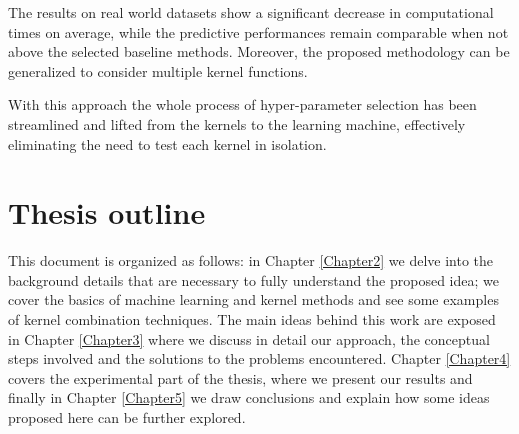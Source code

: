 
The results on real world datasets show a significant decrease in computational
times on average, while the predictive performances remain comparable when not
above the selected baseline methods.
Moreover, the proposed methodology can be generalized to consider multiple kernel functions.

With this approach the whole process of hyper-parameter selection has been streamlined and
lifted from the kernels to the learning machine, effectively eliminating the need to test each
kernel in isolation.


\section{Thesis outline}
This document is organized as follows: in Chapter \ref{Chapter2} we delve into
the background details that are necessary to fully understand the proposed idea;
we cover the basics of machine learning and kernel methods and see some examples
of kernel combination techniques.
The main ideas behind this work are exposed in Chapter \ref{Chapter3} where we
discuss in detail our approach, the conceptual steps involved and the solutions
to the problems encountered.
Chapter \ref{Chapter4} covers the experimental part of the thesis, where we present
our results and finally in Chapter \ref{Chapter5} we draw conclusions and explain
how some ideas proposed here can be further explored.



